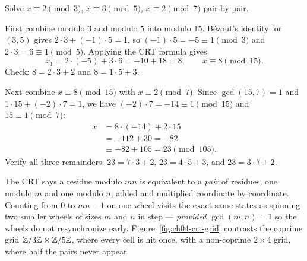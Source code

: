 \begin{example}
\label{ch04:ex-crt-sunzi}
Solve $x \equiv 2 \pmod 3$, $x \equiv 3 \pmod 5$, $x \equiv 2 \pmod 7$ pair by pair.

First combine modulo $3$ and modulo $5$ into modulo $15$. B\'ezout's identity for $(3, 5)$ gives
$2 \cdot 3 + (-1) \cdot 5 = 1$, so $(-1) \cdot 5 = -5 \equiv 1 \pmod 3$ and
$2 \cdot 3 = 6 \equiv 1 \pmod 5$. Applying the CRT formula gives
\[
  x_1 = 2 \cdot (-5) + 3 \cdot 6 = -10 + 18 = 8, \qquad x \equiv 8 \pmod{15}.
\]
Check: $8 = 2 \cdot 3 + 2$ and $8 = 1 \cdot 5 + 3$.

Next combine $x \equiv 8 \pmod{15}$ with $x \equiv 2 \pmod 7$. Since $\gcd(15, 7) = 1$ and
$1 \cdot 15 + (-2) \cdot 7 = 1$, we have $(-2) \cdot 7 = -14 \equiv 1 \pmod{15}$ and
$15 \equiv 1 \pmod 7$:
\begin{align*}
  x &= 8 \cdot (-14) + 2 \cdot 15 \\
    &= -112 + 30 = -82 \\
    &\equiv -82 + 105 = 23 \pmod{105}.
\end{align*}
Verify all three remainders: $23 = 7\cdot 3 + 2$, $23 = 4 \cdot 5 + 3$, and $23 = 3 \cdot 7 + 2$.
\end{example}

\begin{intuitionbox}
The CRT says a residue modulo $mn$ is equivalent to a \emph{pair} of residues, one modulo $m$ and
one modulo $n$, added and multiplied coordinate by coordinate. Counting from $0$ to $mn - 1$ on one
wheel visits the exact same states as spinning two smaller wheels of sizes $m$ and $n$ in step ---
\emph{provided $\gcd(m,n) = 1$} so the wheels do not resynchronize early. Figure~\ref{fig:ch04-crt-grid}
contrasts the coprime grid $\mathbb{Z}/3\mathbb{Z} \times \mathbb{Z}/5\mathbb{Z}$, where every cell is hit once, with a non-coprime
$2 \times 4$ grid, where half the pairs never appear.
\end{intuitionbox}

